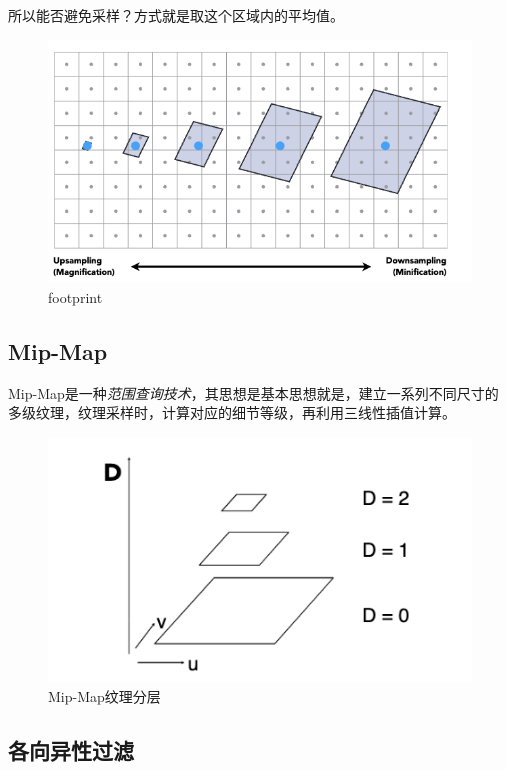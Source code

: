 所以能否避免采样？方式就是取这个区域内的平均值。

\begin{figure}[H]
    \centering
    \includegraphics[scale=0.6]{figures/footprint.png}
    \caption{footprint}
\end{figure}

\subsection*{Mip-Map}

Mip-Map是一种\textsl{范围查询技术}，其思想是基本思想就是，建立一系列不同尺寸的多级纹理，纹理采样时，计算对应的细节等级，再利用三线性插值计算。

\begin{figure}[H]
    \centering
    \includegraphics[scale=0.6]{figures/Mip-Map.png}
    \caption{Mip-Map纹理分层}
\end{figure}

\subsection*{各向异性过滤}



